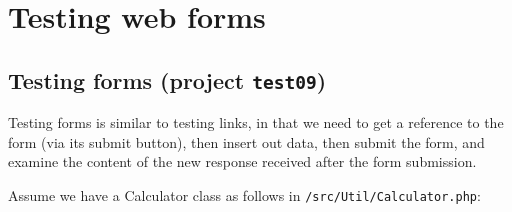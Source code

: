 \documentclass[a4paperpaper,openright]{book}
\begin{document}
\hypertarget{testing-web-forms}{%
\chapter{Testing web forms}\label{testing-web-forms}}

\hypertarget{testing-forms-project-test09}{%
\section{\texorpdfstring{Testing forms (project
\texttt{test09})}{Testing forms (project test09)}}\label{testing-forms-project-test09}}

Testing forms is similar to testing links, in that we need to get a
reference to the form (via its submit button), then insert out data,
then submit the form, and examine the content of the new response
received after the form submission.

Assume we have a Calculator class as follows in
\texttt{/src/Util/Calculator.php}:
\end{document}
